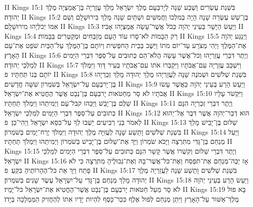 II Kings 15:1	בִּשְׁנַת עֶשְׂרִים וָשֶׁבַע שָׁנָה לְיָרבְעָם מֶלֶךְ יִשְׂרָאֵל מָלַךְ עֲזַרְיָה בֶן־אֲמַצְיָה מֶלֶךְ יְהוּדָה׃
II Kings 15:2	בֶּן־שֵׁשׁ עֶשְׂרֵה שָׁנָה הָיָה בְמלְכוֹ וַחֲמִשִּׁים וּשְׁתַּיִם שָׁנָה מָלַךְ בִּירוּשָׁלָ͏ִם וְשֵׁם אִמּוֹ יְכלְיָהוּ מִירוּשָׁלָ͏ִם׃
II Kings 15:3	וַיַּעַשׂ הַיָּשָׁר בְּעֵינֵי יְהֹוָה כְּכֹל אֲשֶׁר־עָשָׂה אֲמַצְיָהוּ אָבִיו׃
II Kings 15:4	רַק הַבָּמוֹת לֹא־סָרוּ עוֹד הָעָם מְזַבְּחִים וּמְקַטְּרִים בַּבָּמוֹת׃
II Kings 15:5	וַיְנַגַּע יְהֹוָה אֶת־הַמֶּלֶךְ וַיְהִי מְצֹרָע עַד־יוֹם מֹתוֹ וַיֵּשֶׁב בְּבֵית הַחפְשִׁית וְיוֹתָם בֶּן־הַמֶּלֶךְ עַל־הַבַּיִת שֹׁפֵט אֶת־עַם הָאָרֶץ׃
II Kings 15:6	וְיֶתֶר דִּבְרֵי עֲזַרְיָהוּ וְכל־אֲשֶׁר עָשָׂה הֲלֹא־הֵם כְּתוּבִים עַל־סֵפֶר דִּבְרֵי הַיָּמִים לְמַלְכֵי יְהוּדָה׃
II Kings 15:7	וַיִּשְׁכַּב עֲזַרְיָה עִם־אֲבֹתָיו וַיִּקְבְּרוּ אֹתוֹ עִם־אֲבֹתָיו בְּעִיר דָּוִד וַיִּמְלֹךְ יוֹתָם בְּנוֹ תַּחְתָּיו׃ {פ}
II Kings 15:8	בִּשְׁנַת שְׁלֹשִׁים וּשְׁמֹנֶה שָׁנָה לַעֲזַרְיָהוּ מֶלֶךְ יְהוּדָה מָלַךְ זְכַרְיָהוּ בֶן־יָרבְעָם עַל־יִשְׂרָאֵל בְּשֹׁמְרוֹן שִׁשָּׁה חֳדָשִׁים׃
II Kings 15:9	וַיַּעַשׂ הָרַע בְּעֵינֵי יְהֹוָה כַּאֲשֶׁר עָשׂוּ אֲבֹתָיו לֹא סָר מֵחַטֹּאות יָרבְעָם בֶּן־נְבָט אֲשֶׁר הֶחֱטִיא אֶת־יִשְׂרָאֵל׃
II Kings 15:10	וַיִּקְשֹׁר עָלָיו שַׁלֻּם בֶּן־יָבֵשׁ וַיַּכֵּהוּ קבל־עָם וַיְמִיתֵהוּ וַיִּמְלֹךְ תַּחְתָּיו׃
II Kings 15:11	וְיֶתֶר דִּבְרֵי זְכַרְיָה הִנָּם כְּתוּבִים עַל־סֵפֶר דִּבְרֵי הַיָּמִים לְמַלְכֵי יִשְׂרָאֵל׃
II Kings 15:12	הוּא דְבַר־יְהֹוָה אֲשֶׁר דִּבֶּר אֶל־יֵהוּא לֵאמֹר בְּנֵי רְבִיעִים יֵשְׁבוּ לְךָ עַל־כִּסֵּא יִשְׂרָאֵל וַיְהִי־כֵן׃ {פ}
II Kings 15:13	שַׁלּוּם בֶּן־יָבֵישׁ מָלַךְ בִּשְׁנַת שְׁלֹשִׁים וָתֵשַׁע שָׁנָה לְעֻזִּיָּה מֶלֶךְ יְהוּדָה וַיִּמְלֹךְ יֶרַח־יָמִים בְּשֹׁמְרוֹן׃
II Kings 15:14	וַיַּעַל מְנַחֵם בֶּן־גָּדִי מִתִּרְצָה וַיָּבֹא שֹׁמְרוֹן וַיַּךְ אֶת־שַׁלּוּם בֶּן־יָבֵישׁ בְּשֹׁמְרוֹן וַיְמִיתֵהוּ וַיִּמְלֹךְ תַּחְתָּיו׃
II Kings 15:15	וְיֶתֶר דִּבְרֵי שַׁלּוּם וְקִשְׁרוֹ אֲשֶׁר קָשָׁר הִנָּם כְּתוּבִים עַל־סֵפֶר דִּבְרֵי הַיָּמִים לְמַלְכֵי יִשְׂרָאֵל׃
II Kings 15:16	אָז יַכֶּה־מְנַחֵם אֶת־תִּפְסַח וְאֶת־כּל־אֲשֶׁר־בָּהּ וְאֶת־גְּבוּלֶיהָ מִתִּרְצָה כִּי לֹא פָתַח וַיַּךְ אֵת כּל־הֶהָרוֹתֶיהָ בִּקֵּעַ׃ {פ}
II Kings 15:17	בִּשְׁנַת שְׁלֹשִׁים וָתֵשַׁע שָׁנָה לַעֲזַרְיָה מֶלֶךְ יְהוּדָה מָלַךְ מְנַחֵם בֶּן־גָּדִי עַל־יִשְׂרָאֵל עֶשֶׂר שָׁנִים בְּשֹׁמְרוֹן׃
II Kings 15:18	וַיַּעַשׂ הָרַע בְּעֵינֵי יְהֹוָה לֹא סָר מֵעַל חַטֹּאות יָרבְעָם בֶּן־נְבָט אֲשֶׁר־הֶחֱטִיא אֶת־יִשְׂרָאֵל כּל־יָמָיו׃
II Kings 15:19	בָּא פוּל מֶלֶךְ־אַשּׁוּר עַל־הָאָרֶץ וַיִּתֵּן מְנַחֵם לְפוּל אֶלֶף כִּכַּר־כָּסֶף לִהְיוֹת יָדָיו אִתּוֹ לְהַחֲזִיק הַמַּמְלָכָה בְּיָדוֹ׃
